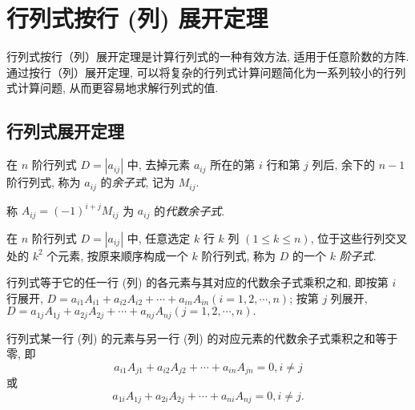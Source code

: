 \section{行列式按行 (列) 展开定理}

行列式按行（列）展开定理是计算行列式的一种有效方法, 适用于任意阶数的方阵. 通过按行（列）展开定理, 可以将复杂的行列式计算问题简化为一系列较小的行列式计算问题, 从而更容易地求解行列式的值.

\subsection{行列式展开定理}

\begin{definition}[余子式]
    在 $ n $ 阶行列式 $ D=\left|a_{i j}\right| $ 中, 去掉元素 $ a_{i j} $ 所在的第 $ i $ 行和第 $ j $ 列后, 余下的 $ n-1 $ 阶行列式, 称为 $ a_{i j} $ 的\textit{余子式}, 记为 $ M_{i j} .$
\end{definition}
\begin{definition}[代数余子式]
    称 $ A_{i j}=(-1)^{i+j} M_{i j} $ 为 $ a_{i j} $ 的\textit{代数余子式}.
\end{definition}
\begin{definition}[$ k $ 阶子式]
    在 $ n $ 阶行列式 $ D=\left|a_{i j}\right| $ 中, 任意选定 $ k $ 行 $ k $ 列 $ (1 \leqslant k \leqslant n) $, 
    位于这些行列交叉处的 $ k^{2} $ 个元素, 按原来顺序构成一个 $ k $ 阶行列式, 称为 $ D $ 的一个 $ k $ \textit{阶子式}.
\end{definition}
\begin{theorem}[按行 (列) 展开]
    行列式等于它的任一行 (列) 的各元素与其对应的代数余子式乘积之和, 即按第 $ i $ 行展开, $D=a_{i 1} A_{i 1}+a_{i 2} A_{i 2}+\cdots+a_{i n} A_{i n}(i=1,2, \cdots, n) $;
    按第 $ j $ 列展开, $D=a_{1 j} A_{1 j}+a_{2 j} A_{2 j}+\cdots+a_{n j} A_{n j}(j=1,2, \cdots, n) .$

    行列式某一行 (列) 的元素与另一行 (列) 的对应元素的代数余子式乘积之和等于零, 即
    $$a_{i 1} A_{j 1}+a_{i 2} A_{j 2}+\cdots+a_{i n} A_{j n}=0, i \neq j$$
    或
    $$a_{1 i} A_{1 j}+a_{2 i} A_{2 j}+\cdots+a_{n i} A_{n j}=0, i \neq j .$$
\end{theorem}

